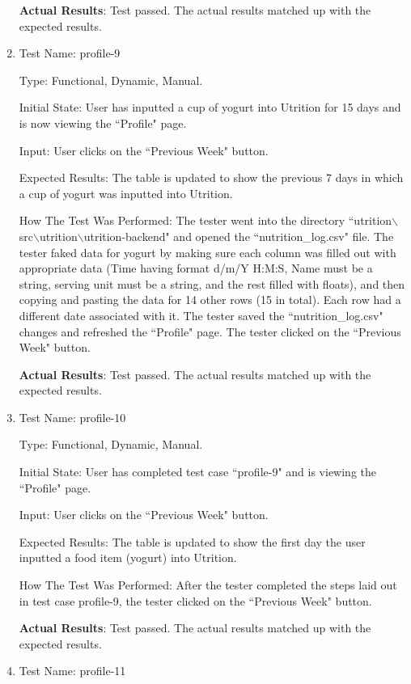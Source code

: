 \documentclass[12pt, titlepage]{article}
\begin{document}
\begin{enumerate}
		\textbf{Actual Results}: Test passed. The actual results matched up with the expected results.
		
		\item{Test Name: profile-9}
		
		Type: Functional, Dynamic, Manual.
		
		Initial State: User has inputted a cup of yogurt into Utrition for 15 days and is now viewing the ``Profile" page.
		
		Input: User clicks on the ``Previous Week" button.
		
		Expected Results: The table is updated to show the previous 7 days in which a cup of yogurt was inputted into Utrition. 
		
		How The Test Was Performed: The tester went into the directory ``utrition$\backslash$src$\backslash$utrition$\backslash$utrition-backend" and opened the ``nutrition\_log.csv" file. The tester faked data for yogurt by making sure each column was filled out with appropriate data (Time having format d/m/Y H:M:S, Name must be a string, serving unit must be a string, and the rest filled with floats), and then copying and pasting the data for 14 other rows (15 in total). Each row had a different date associated with it. The tester saved the ``nutrition\_log.csv" changes and refreshed the ``Profile" page. The tester clicked on the ``Previous Week" button.
		
		\textbf{Actual Results}: Test passed. The actual results matched up with the expected results.
		
		\item{Test Name: profile-10}
		
		Type: Functional, Dynamic, Manual.
		
		Initial State: User has completed test case ``profile-9" and is viewing the ``Profile" page.
		
		Input: User clicks on the ``Previous Week" button.
		
		Expected Results: The table is updated to show the first day the user inputted a food item (yogurt) into Utrition.
		
		How The Test Was Performed: After the tester completed the steps laid out in test case profile-9, the tester clicked on the ``Previous Week" button.
		
		\textbf{Actual Results}: Test passed. The actual results matched up with the expected results.
		
		\item{Test Name: profile-11}
		

\end{enumerate}
\end{document}
